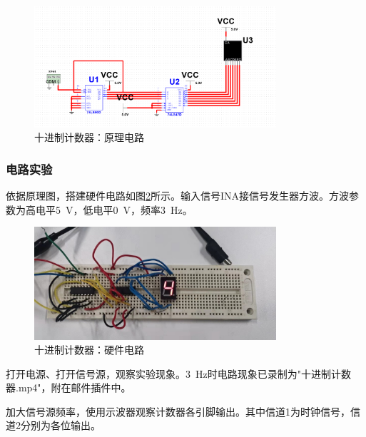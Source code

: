 \documentclass[UTF8]{ctexart}
\numberwithin{figure}{subsection}
\numberwithin{table}{subsection}
\numberwithin{equation}{subsection}
\begin{document}
\begin{figure}[H]
    \begin{center}
        \includegraphics[width=0.8\textwidth]{design/10 circuit.png}
    \end{center}
    \caption{十进制计数器：原理电路}
    \label{10 theory cir}
\end{figure}

\subsubsection{电路实验}
\par 依据原理图，搭建硬件电路如图\ref{10 cir}所示。输入信号INA接信号发生器方波。方波参数为高电平\SI{5}{\volt}，低电平\SI{0}{\volt}，频率\SI{3}{\hertz}。

\begin{figure}[H]
    \begin{center}
        \includegraphics[width=0.8\textwidth]{10/circuit.jpg}
    \end{center}
    \caption{十进制计数器：硬件电路}
    \label{10 cir}
\end{figure}

\par 打开电源、打开信号源，观察实验现象。\SI{3}{\hertz}时电路现象已录制为"十进制计数器.mp4"，附在邮件插件中。
\par 加大信号源频率，使用示波器观察计数器各引脚输出。其中信道1为时钟信号，信道2分别为各位输出。
\end{document}
